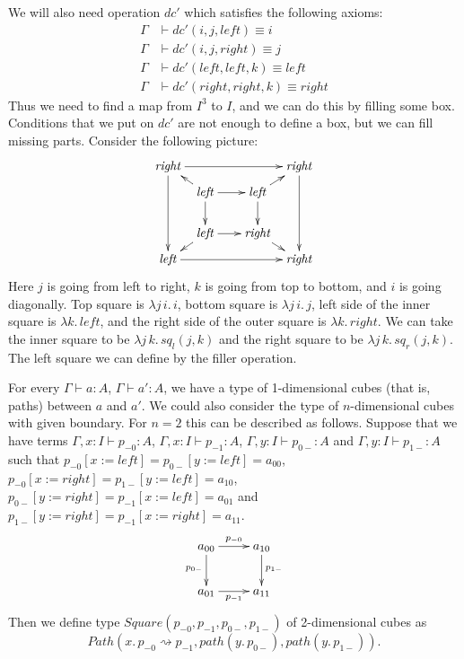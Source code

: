 \documentclass{mscs}
\newcommand{\deq}{\equiv}
\newcommand{\repl}{:=}
\newcommand{\leftI}{\mathit{left}}
\newcommand{\rightI}{\mathit{right}}
\newcommand{\sq}{\mathit{sq}}
\newcommand{\dc}{\mathit{dc}}
\newcommand{\idtype}{\rightsquigarrow}
\newcommand{\Path}{\mathit{Path}}
\newcommand{\pathI}{\mathit{path}}
\newcommand{\Square}{\mathit{Square}}
\numberwithin{figure}{section}
\begin{document}
We will also need operation $\dc'$ which satisfies the following axioms:
\begin{align*}
\Gamma & \vdash \dc'(i,j,\leftI) \deq i \\
\Gamma & \vdash \dc'(i,j,\rightI) \deq j \\
\Gamma & \vdash \dc'(\leftI,\leftI,k) \deq \leftI \\
\Gamma & \vdash \dc'(\rightI,\rightI,k) \deq \rightI
\end{align*}
Thus we need to find a map from $I^3$ to $I$, and we can do this by filling some box.
Conditions that we put on $\dc'$ are not enough to define a box, but we can fill missing parts.
Consider the following picture:
\[ \xymatrix @C=0.5pc @R=0.5pc
    { \rightI \ar[rrrr] \ar[dddd] &           & &                        & \rightI \ar[dddd] \\
             & \leftI \ar[rr] \ar[dd] \ar[ul] & & \leftI \ar[dd] \ar[ur] & \\
             &                                & &                        & \\
             & \leftI \ar[rr] \ar[dl]         & & \rightI \ar[dr]        & \\
      \leftI \ar[rrrr]            &           & &                        & \rightI
    }\]
Here $j$ is going from left to right, $k$ is going from top to bottom, and $i$ is going diagonally.
Top square is $\lambda j\,i.\,i$, bottom square is $\lambda j\,i.\,j$, left side of the inner square is $\lambda k.\,\leftI$,
and the right side of the outer square is $\lambda k.\,\rightI$.
We can take the inner square to be $\lambda j\,k.\,\sq_l(j,k)$ and the right square to be $\lambda j\,k.\,\sq_r(j,k)$.
The left square we can define by the filler operation.

For every $\Gamma \vdash a : A$, $\Gamma \vdash a' : A$, we have a type of 1-dimensional cubes (that is, paths) between $a$ and $a'$.
We could also consider the type of $n$-dimensional cubes with given boundary.
For $n = 2$ this can be described as follows.
Suppose that we have terms $\Gamma, x : I \vdash p_{-0} : A$, $\Gamma, x : I \vdash p_{-1} : A$, $\Gamma, y : I \vdash p_{0-} : A$ and $\Gamma, y : I \vdash p_{1-} : A$
such that $p_{-0}[x \repl \leftI] = p_{0-}[y \repl \leftI] = a_{00}$, $p_{-0}[x \repl \rightI] = p_{1-}[y \repl \leftI] = a_{10}$,
$p_{0-}[y \repl \rightI] = p_{-1}[x \repl \leftI] = a_{01}$ and $p_{1-}[y \repl \rightI] = p_{-1}[x \repl \rightI] = a_{11}$.
\[ \xymatrix{ a_{00} \ar[r]^{p_{-0}} \ar[d]_{p_{0-}} & a_{10} \ar[d]^{p_{1-}} \\
              a_{01} \ar[r]_{p_{-1}}                 & a_{11}
            } \]
Then we define type $\Square(p_{-0},p_{-1},p_{0-},p_{1-})$ of 2-dimensional cubes as
\[ \Path(x.\,p_{-0} \idtype p_{-1}, \pathI(y.\,p_{0-}), \pathI(y.\,p_{1-})). \]
\end{document}
